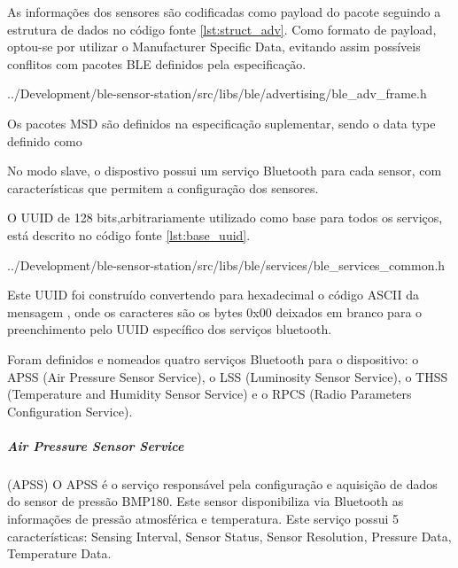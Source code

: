 As informações dos sensores são codificadas como payload do pacote seguindo a
estrutura de dados no código fonte \ref{lst:struct_adv}. Como formato de
payload, optou-se por utilizar o Manufacturer Specific Data, evitando assim
possíveis conflitos com pacotes BLE definidos pela especificação.


{../Development/ble-sensor-station/src/libs/ble/advertising/ble_adv_frame.h}

Os pacotes MSD são definidos na especificação suplementar, sendo o data type
definido como  

% 

No modo slave, o dispostivo possui um serviço Bluetooth para cada sensor, com
características que permitem a configuração dos sensores.

O UUID de 128 bits,arbitrariamente utilizado como base para
todos os serviços, está descrito no código fonte \ref{lst:base_uuid}.


{../Development/ble-sensor-station/src/libs/ble/services/ble_services_common.h}

Este UUID foi construído convertendo para hexadecimal o código ASCII da mensagem
, onde os caracteres \dblquote{\_\_} são os bytes
0x00 deixados em branco para o preenchimento pelo UUID específico dos serviços
bluetooth.

Foram definidos e nomeados quatro serviços Bluetooth para o dispositivo: o APSS
(Air Pressure Sensor Service), o LSS (Luminosity Sensor Service), o THSS
(Temperature and Humidity Sensor Service) e o RPCS (Radio Parameters
Configuration Service).

\newpage
\subparagraph{Air Pressure Sensor Service}(APSS) 
\newline
O APSS é o serviço responsável pela configuração e aquisição de dados do sensor
de pressão BMP180. Este sensor disponibiliza via Bluetooth as informações de
pressão atmosférica e temperatura. Este serviço possui 5 características:
Sensing Interval, Sensor Status, Sensor Resolution, Pressure Data, Temperature
Data.

